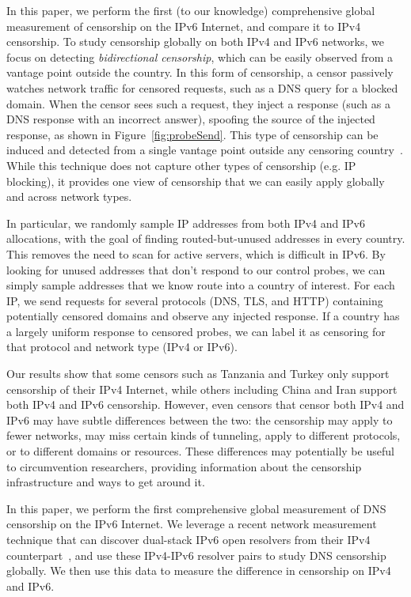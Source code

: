 In this paper, we perform the first (to our knowledge) comprehensive global measurement of
censorship on the IPv6 Internet, and compare it to IPv4 censorship.
To study censorship globally on both IPv4 and IPv6 networks, we focus on
detecting \emph{bidirectional censorship}, which can be easily observed from a
vantage point outside the country. In this form of censorship, a censor
passively watches network traffic for censored requests, such as a DNS query
for a blocked domain. When the censor sees such a request, they inject a response (such as a DNS
response with an incorrect answer), spoofing the source of the injected
response,
as shown in Figure~\ref{fig:probeSend}.
This type of censorship can be induced and detected from a single
vantage point outside any censoring
country~\cite{vanderslooth2018quack,collateral-dns,pearce2017global,scott2016satellite}.
While this technique does not capture other types of censorship (e.g. IP
blocking), it provides one view
of censorship that we can easily apply globally and across network types.

In particular, we randomly sample IP addresses from both IPv4 and IPv6
allocations, with the goal of finding routed-but-unused addresses in every
country. This removes the need to scan for active servers, which is difficult in
IPv6. By looking for unused addresses that don't respond to our control probes,
we can simply sample addresses that we know route into a country of interest.
%
For each IP, we send requests for several protocols (DNS, TLS, and HTTP)
containing potentially censored domains and observe any injected response. If a
country has a largely uniform response to censored probes, we can label it as
censoring for that protocol and network type (IPv4 or IPv6).

\medskip
Our results show that
some censors such as Tanzania and Turkey only support censorship of
their IPv4 Internet,
while others including China and Iran support both IPv4 and IPv6 censorship.
However, even censors that censor both IPv4 and IPv6 may have subtle differences
between the two: the censorship may apply to fewer networks, may miss certain
kinds of tunneling, apply to different
protocols, or to different domains or resources. These differences may
potentially be useful to circumvention researchers, providing information about
the censorship infrastructure and ways to get around it.


In this paper, we perform the first comprehensive global measurement of DNS
censorship on the IPv6 Internet. We leverage a recent network measurement
technique that can discover dual-stack IPv6 open resolvers from their IPv4
counterpart~\cite{hendriks2017potential}, and use these IPv4-IPv6 resolver pairs
to study DNS censorship globally. %
We then use this data to measure the difference in censorship on IPv4 and IPv6.

